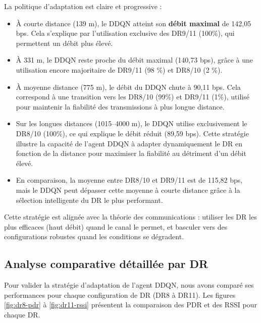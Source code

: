 La politique d'adaptation est claire et progressive :
\begin{itemize}
	\item À courte distance (139 m), le DDQN atteint son \textbf{débit maximal} de 142,05 bps. Cela s'explique par l'utilisation exclusive des DR9/11 (100\%), qui permettent un débit plus élevé.
	
	\item À  331 m, le DDQN reste proche du débit  maximal (140,73 bps), grâce à une utilisation encore majoritaire de DR9/11 (98 \%) et DR8/10 (2 \%).
	
	\item À moyenne distance (775 m), le débit du DDQN chute à 90,11 bps. Cela correspond à une transition vers les DR8/10 (99\%) et DR9/11 (1\%), utilisé pour maintenir la fiabilité des transmissions à plus longue distance.
	
	\item Sur les longues distances (1015–4000 m), le DDQN utilise exclusivement le DR8/10 (100\%), ce qui explique le débit réduit (89,59 bps). Cette stratégie illustre la capacité de l'agent DDQN à adapter dynamiquement le DR en fonction de la distance pour maximiser la fiabilité au détriment d'un débit élevé.
	
	\item En comparaison, la moyenne entre DR8/10 et DR9/11 est de 115,82 bps, mais le DDQN peut dépasser cette moyenne à courte distance grâce à la sélection intelligente du DR le plus performant.
\end{itemize}

Cette stratégie est alignée avec la théorie des communications : utiliser les DR les plus efficaces (haut débit) quand le canal le permet, et basculer vers des configurations robustes quand les conditions se dégradent.

\subsection{Analyse comparative détaillée par DR}

Pour valider la stratégie d'adaptation de l'agent DDQN, nous avons comparé ses performances pour chaque configuration de DR (DR8 à DR11). Les figures \ref{fig:dr8-pdr} à \ref{fig:dr11-rssi} présentent la comparaison des PDR et des RSSI pour chaque DR.

